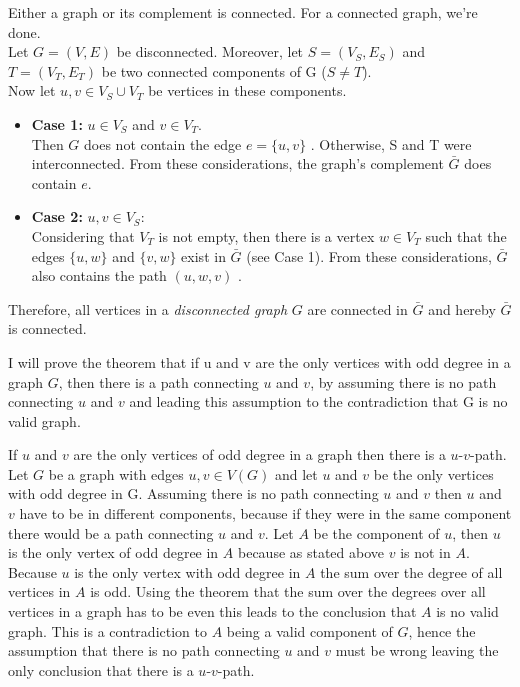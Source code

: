 \documentclass[a4paper]{article}
\begin{document}
	\begin{solution}{3}
		\begin{theorem}{Either a graph or its complement is connected.}
			For a connected graph, we're done.\\
			Let $G = (V, E)$ be disconnected. Moreover, let $S = (V_S, E_S)$ and $T = (V_T, E_T)$ be two connected components of G ($S \neq T$).\\
			Now let $u, v \in V_S \cup V_T$ be vertices in these components.
			\begin{itemize}
				\item \textbf{Case 1: } $u \in V_S$ and $v \in V_T$.\\
					Then $G$ does not contain the edge $e = \{u, v\}$ . Otherwise, S and T were interconnected. From these considerations, the graph's complement $\bar{G}$ does contain $e$.
				\item  \textbf{Case 2: } $u, v \in V_S$:\\
					Considering that $V_T$ is not empty, then there is a vertex $w \in V_T$ such that the edges $\{u, w\}$ and $\{v, w\}$ exist in $\bar{G}$ (see Case 1). From these considerations, $\bar{G}$ also contains the path $(u, w, v)$ .
			\end{itemize}
			Therefore, all vertices in a \emph{disconnected graph} $G$ are connected in $\bar{G}$ and hereby $\bar{G}$ is connected.\\
		\end{theorem}
	\end{solution} 
	\newpage
	\begin{solution}{4}
		I will prove the theorem that if u and v are the only vertices with odd degree in a graph $G$, then there is a path connecting $u$ and $v$, by assuming there is no path connecting $u$ and $v$ and leading this assumption to the contradiction that G is no valid graph. 
		\begin{theorem}{If $u$ and $v$ are the only vertices of odd degree in a graph then there is a $u$-$v$-path.}
		Let $G$ be a graph with edges $u,v \in V(G)$ and let $u$ and $v$ be the only vertices with odd degree in G. 
		Assuming there is no path connecting $u$ and $v$ then $u$ and $v$ have to be in different components, because if they were in the same component there would be a path connecting $u$ and $v$. 
		Let $A$ be the component of $u$, then $u$ is the only vertex of odd degree in $A$ because as stated above $v$ is not in $A$. Because $u$ is the only vertex with odd degree in $A$ the sum over the degree of all vertices in $A$ is odd. 
		Using the theorem that the sum over the degrees over all vertices in a graph has to be even this leads to the conclusion that $A$ is no valid graph. 
		This is a contradiction to $A$ being a valid component of $G$, hence the assumption that there is no path connecting $u$ and $v$ must be wrong leaving the only conclusion that there is a $u$-$v$-path.	
		\end{theorem}
	\end{solution}
\end{document}
